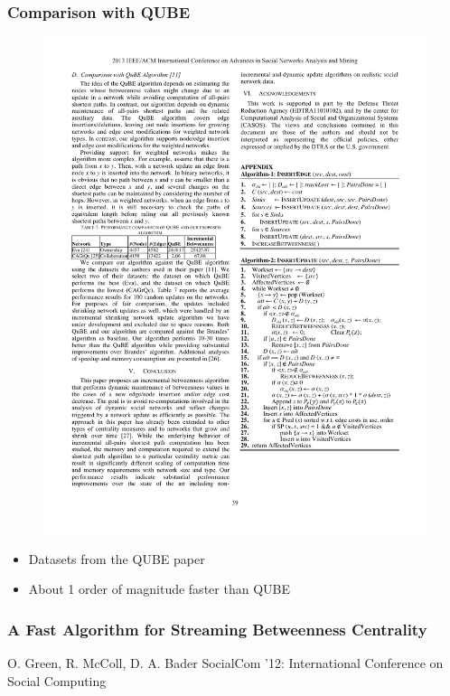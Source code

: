 \begin{frame}
  \frametitle{Comparison with QUBE}

  \begin{figure}[t]
    \centering
    \includegraphics[width=\textwidth, height=0.7\textheight, keepaspectratio]{imgs/kas-results2}
  \end{figure}

  \begin{itemize}
    \item Datasets from the QUBE paper
    \item About 1 order of magnitude faster than QUBE
  \end{itemize}
    
\end{frame}


\begin{frame}
  \frametitle{A Fast Algorithm for Streaming Betweenness Centrality}
  \centering
  \vfill
  {\huge O. Green, R. McColl, D. A. Bader}
  \vfill
  {\large SocialCom '12: International Conference on Social Computing}
\end{frame}

